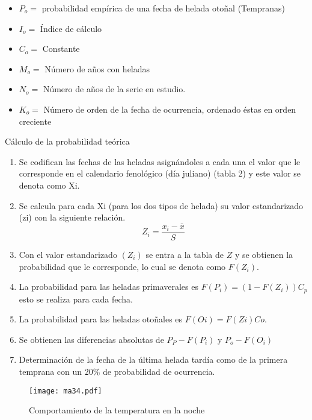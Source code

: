     \begin{notation}
        \begin{itemize}
            \item $P_o =$ probabilidad empírica de una fecha de helada otoñal (Tempranas)
            \item $I_o =$ Índice de cálculo
            \item $C_o =$ Constante
            \item $M_o =$ Número de años con heladas
            \item $N_o =$ Número de años de la serie en estudio.
            \item $K_o =$ Número de orden de la fecha de ocurrencia, ordenado éstas en orden creciente
        \end{itemize}
        \end{notation}
    Cálculo de la probabilidad teórica
    \begin{enumerate}
        \item Se codifican las fechas de las heladas asignándoles a cada una el valor que le corresponde en el calendario fenológico (día juliano) (tabla 2) y este valor se denota como Xi.
        \item Se calcula para cada Xi (para los dos tipos de helada) su valor estandarizado (zi) con la siguiente relación.
        \begin{equation}
            Z_i = \frac{x_i - \bar{x}}{S}
        \end{equation}
        \item Con el valor estandarizado $(Z_i)$ se entra a la tabla de $Z$ y se obtienen la probabilidad que le corresponde, lo cual se denota como $F (Z_i)$.
        \item La probabilidad para las heladas primaverales es $F(P_i) = (1-F(Z_i))C_p$ esto se realiza para cada fecha.
        \item La probabilidad para las heladas otoñales es $F(Oi) = F (Zi) Co$. 
        \item Se obtienen las diferencias absolutas de $P_P- F(P_i)$ y $P_o-F(O_i)$
        \item Determinación de la fecha de la última helada tardía como de la primera temprana con un 20\% de probabilidad de ocurrencia.
    \end{enumerate}

    \begin{figure}[h!]
        \centering
          \texttt{[image: ma34.pdf]}
          \caption{Comportamiento de la temperatura en la noche}
          \label{ma34}
        \end{figure}
        
